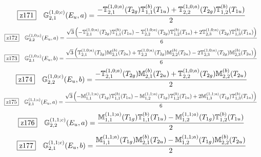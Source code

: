 \documentclass[fleqn,10pt,landscape]{jsarticle}
\begin{document}
\begin{dmath*}
\hspace*{3mm}\fbox{z171}\quad \mathbb{G}_{2,1}^{(1,0;c)}(E_{u},a)=\frac{- \mathbb{T}_{2,1}^{(1,0;a)}(T_{2g}) \mathbb{T}_{1,1}^{(b)}(T_{1u}) + \mathbb{T}_{2,2}^{(1,0;a)}(T_{2g}) \mathbb{T}_{1,2}^{(b)}(T_{1u})}{2}
\end{dmath*}
\begin{dmath*}
\hspace*{3mm}\fbox{z172}\quad \mathbb{G}_{2,2}^{(1,0;c)}(E_{u},a)=\frac{\sqrt{3} \left(- \mathbb{T}_{2,1}^{(1,0;a)}(T_{2g}) \mathbb{T}_{1,1}^{(b)}(T_{1u}) - \mathbb{T}_{2,2}^{(1,0;a)}(T_{2g}) \mathbb{T}_{1,2}^{(b)}(T_{1u}) + 2 \mathbb{T}_{2,3}^{(1,0;a)}(T_{2g}) \mathbb{T}_{1,3}^{(b)}(T_{1u})\right)}{6}
\end{dmath*}
\begin{dmath*}
\hspace*{3mm}\fbox{z173}\quad \mathbb{G}_{2,1}^{(1,0;c)}(E_{u},b)=\frac{\sqrt{3} \left(\mathbb{T}_{2,1}^{(1,0;a)}(T_{2g}) \mathbb{M}_{2,1}^{(b)}(T_{2u}) + \mathbb{T}_{2,2}^{(1,0;a)}(T_{2g}) \mathbb{M}_{2,2}^{(b)}(T_{2u}) - 2 \mathbb{T}_{2,3}^{(1,0;a)}(T_{2g}) \mathbb{M}_{2,3}^{(b)}(T_{2u})\right)}{6}
\end{dmath*}
\begin{dmath*}
\hspace*{3mm}\fbox{z174}\quad \mathbb{G}_{2,2}^{(1,0;c)}(E_{u},b)=\frac{- \mathbb{T}_{2,1}^{(1,0;a)}(T_{2g}) \mathbb{M}_{2,1}^{(b)}(T_{2u}) + \mathbb{T}_{2,2}^{(1,0;a)}(T_{2g}) \mathbb{M}_{2,2}^{(b)}(T_{2u})}{2}
\end{dmath*}
\begin{dmath*}
\hspace*{3mm}\fbox{z175}\quad \mathbb{G}_{2,1}^{(1,1;c)}(E_{u},a)=\frac{\sqrt{3} \left(- \mathbb{M}_{1,1}^{(1,1;a)}(T_{1g}) \mathbb{T}_{1,1}^{(b)}(T_{1u}) - \mathbb{M}_{1,2}^{(1,1;a)}(T_{1g}) \mathbb{T}_{1,2}^{(b)}(T_{1u}) + 2 \mathbb{M}_{1,3}^{(1,1;a)}(T_{1g}) \mathbb{T}_{1,3}^{(b)}(T_{1u})\right)}{6}
\end{dmath*}
\begin{dmath*}
\hspace*{3mm}\fbox{z176}\quad \mathbb{G}_{2,2}^{(1,1;c)}(E_{u},a)=\frac{\mathbb{M}_{1,1}^{(1,1;a)}(T_{1g}) \mathbb{T}_{1,1}^{(b)}(T_{1u}) - \mathbb{M}_{1,2}^{(1,1;a)}(T_{1g}) \mathbb{T}_{1,2}^{(b)}(T_{1u})}{2}
\end{dmath*}
\begin{dmath*}
\hspace*{3mm}\fbox{z177}\quad \mathbb{G}_{2,1}^{(1,1;c)}(E_{u},b)=\frac{\mathbb{M}_{1,1}^{(1,1;a)}(T_{1g}) \mathbb{M}_{2,1}^{(b)}(T_{2u}) - \mathbb{M}_{1,2}^{(1,1;a)}(T_{1g}) \mathbb{M}_{2,2}^{(b)}(T_{2u})}{2}
\end{dmath*}
\end{document}
